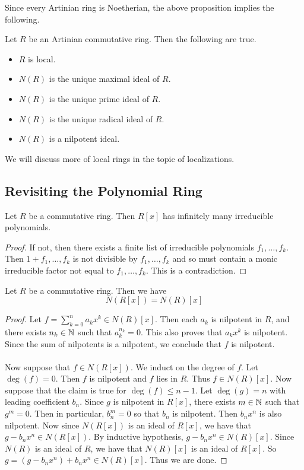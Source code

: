 \documentclass[a4paper]{article}
\begin{document}
Since every Artinian ring is Noetherian, the above proposition implies the following. 

\begin{crl}{}{} Let $R$ be an Artinian commutative ring. Then the following are true. 
\begin{itemize}
\item $R$ is local. 
\item $N(R)$ is the unique maximal ideal of $R$. 
\item $N(R)$ is the unique prime ideal of $R$. 
\item $N(R)$ is the unique radical ideal of $R$. 
\item $N(R)$ is a nilpotent ideal. 
\end{itemize}
\end{crl}

We will discuss more of local rings in the topic of localizations. 

\subsection{Revisiting the Polynomial Ring}
\begin{lmm}{}{} Let $R$ be a commutative ring. Then $R[x]$ has infinitely many irreducible polynomials. 
\begin{proof}
If not, then there exists a finite list of irreducible polynomials $f_1,\dots,f_k$. Then $1+f_1,\dots,f_k$ is not divisible by $f_1,\dots,f_k$ and so must contain a monic irreducible factor not equal to $f_1,\dots,f_k$. This is a contradiction. 
\end{proof}
\end{lmm}

\begin{prp}{}{} Let $R$ be a commutative ring. Then we have $$N(R[x])=N(R)[x]$$ 
\begin{proof}
Let $f=\sum_{k=0}^na_kx^k\in N(R)[x]$. Then each $a_k$ is nilpotent in $R$, and there exists $n_k\in\mathbb{N}$ such that $a_k^{n_k}=0$. This also proves that $a_kx^k$ is nilpotent. Since the sum of nilpotents is a nilpotent, we conclude that $f$ is nilpotent. \\~\\

Now suppose that $f\in N(R[x])$. We induct on the degree of $f$. Let $\deg(f)=0$. Then $f$ is nilpotent and $f$ lies in $R$. Thus $f\in N(R)[x]$. Now suppose that the claim is true for $\deg(f)\leq n-1$. Let $\deg(g)=n$ with leading coefficient $b_n$. Since $g$ is nilpotent in $R[x]$, there exists $m\in\mathbb{N}$ such that $g^m=0$. Then in particular, $b_n^m=0$ so that $b_n$ is nilpotent. Then $b_nx^n$ is also nilpotent. Now since $N(R[x])$ is an ideal of $R[x]$, we have that $g-b_nx^n\in N(R[x])$. By inductive hypothesis, $g-b_nx^n\in N(R)[x]$. Since $N(R)$ is an ideal of $R$, we have that $N(R)[x]$ is an ideal of $R[x]$. So $g=(g-b_nx^n)+b_nx^n\in N(R)[x]$. Thus we are done. 
\end{proof}
\end{prp}
\end{document}
